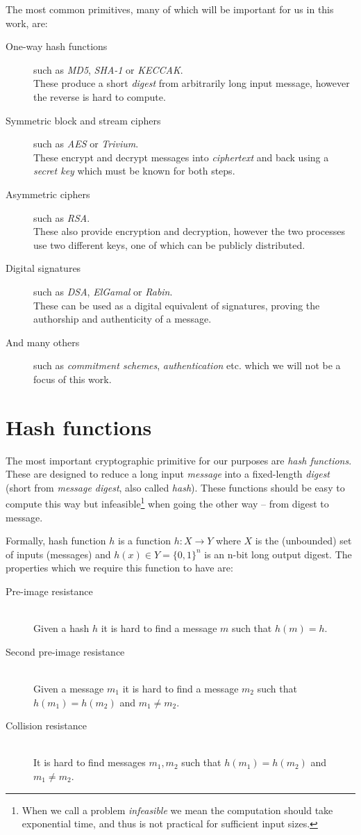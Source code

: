 The most common primitives, many of which will be important for us in this work, are:
\begin{description}
\item[One-way hash functions] such as \emph{MD5}, \emph{SHA-1} or \emph{KECCAK}. \\
These produce a short \emph{digest} from arbitrarily long input message, however the reverse is hard to compute.
\item[Symmetric block and stream ciphers] such as \emph{AES} or \emph{Trivium}. \\
These encrypt and decrypt messages into \emph{ciphertext} and back using a \emph{secret key} which must be known for both steps.
\item[Asymmetric ciphers] such as \emph{RSA}. \\ 
These also provide encryption and decryption, however the two processes use two different keys, one of which can be publicly distributed.
\item[Digital signatures] such as \emph{DSA}, \emph{ElGamal} or \emph{Rabin}. \\
These can be used as a digital equivalent of signatures, proving the authorship and authenticity of a message.
\item[And many others] such as \emph{commitment schemes}, \emph{authentication} etc. which we will not be a focus of this work.
\end{description}

\section{Hash functions}
The most important cryptographic primitive for our purposes are \emph{hash functions}.
These are designed to reduce a long input \emph{message} into a fixed-length \emph{digest} (short from \emph{message digest}, also called \emph{hash}).
These functions should be easy to compute this way but infeasible\footnote{When we call a problem \emph{infeasible} we mean the computation should take exponential time, and thus is not practical for sufficient input sizes.} when going the other way -- from digest to message.

Formally, hash function $h$ is a function $h: X \to Y$ where $X$ is the (unbounded) set of inputs (messages) and $h(x) \in Y = \{0, 1\}^n$ is an n-bit long output digest.
The properties which we require this function to have are:

\begin{description}
\item[Pre-image resistance] \hfill \\
Given a hash $h$ it is hard to find a message $m$ such that $h(m) = h$.
\item[Second pre-image resistance] \hfill \\
Given a message $m_1$ it is hard to find a message $m_2$ such that $h(m_1) = h(m_2)$ and $m_1 \neq m_2$.
\item[Collision resistance] \hfill \\
It is hard to find messages $m_1, m_2$ such that $h(m_1) = h(m_2)$ and $m_1 \neq m_2$.
\end{description}


